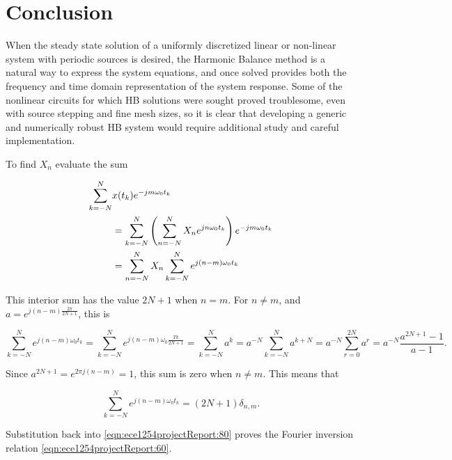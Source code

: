 \section{Conclusion}

When the steady state solution of a uniformly discretized linear or non-linear system with periodic sources is desired, the Harmonic Balance method is a natural way to express the system equations, and once solved provides both the frequency and time domain representation of the system response.  Some of the nonlinear circuits for which HB solutions were sought proved troublesome, even with source stepping and fine mesh sizes, so it is clear that developing a generic and numerically robust HB system would require additional study and careful implementation.

\appendices

\label{appendix:discreteFourierInversion}

To find \( X_n \) evaluate the sum

\begin{equation}\label{eqn:ece1254projectReport:80}
\begin{aligned}
\sum_{k = -N}^N &x(t_k) e^{-j m \omega_0 t_k} \\
&=
\sum_{k = -N}^N
\lr{
\sum_{n = -N}^N X_n e^{ j n \omega_0 t_k}
}
e^{-j m \omega_0 t_k} \\
&=
\sum_{n = -N}^N X_n
\sum_{k = -N}^N
e^{ j (n -m )\omega_0 t_k}
\end{aligned}
\end{equation}

This interior sum has the value \( 2 N + 1 \) when \( n = m \).
For \( n \ne m \), and
\( a = e^{j (n -m ) \frac{2 \pi}{2 N + 1}} \), this is

\begin{dmath}\label{eqn:ece1254projectReport:100}
\sum_{k = -N}^N
e^{ j (n -m )\omega_0 t_k}
=
\sum_{k = -N}^N
e^{ j (n -m )\omega_0 \frac{T k}{2 N + 1}}
=
\sum_{k = -N}^N a^k
=
a^{-N} \sum_{k = -N}^N a^{k+ N}
=
a^{-N} \sum_{r = 0}^{2 N} a^{r}
=
a^{-N} \frac{a^{2 N + 1} - 1}{a - 1}.
\end{dmath}

Since \( a^{2 N + 1} = e^{2 \pi j (n - m)} = 1 \), this sum is zero when \( n \ne m \).
This means that

\begin{equation}\label{eqn:ece1254projectReport:120}
\sum_{k = -N}^N
e^{ j (n -m )\omega_0 t_k} = (2 N + 1) \delta_{n,m}.
\end{equation}

Substitution back into \cref{eqn:ece1254projectReport:80} proves the Fourier inversion relation \cref{eqn:ece1254projectReport:60}.

